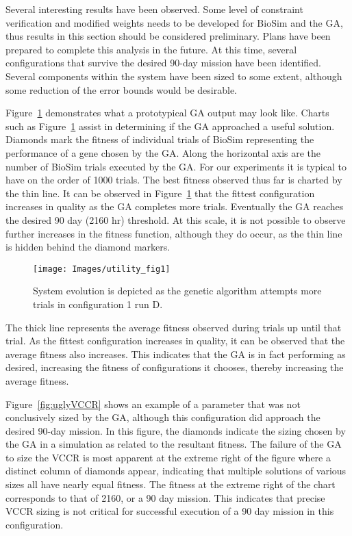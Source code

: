 \documentclass[submit]{aiaa}
\begin{document}
Several interesting results have been observed. 
Some level of constraint verification and modified weights needs to be developed for BioSim and the GA,  thus results in this section should be considered preliminary. 
Plans have been prepared to complete this analysis in the future. 
At this time, several configurations that survive the desired 90-day
mission have been identified.  
Several components within the system have been sized to some extent, although
some reduction of the error bounds would be desirable.

Figure~\ref{fig:utilityFig} demonstrates what a prototypical GA output
may look like. Charts such as Figure~\ref{fig:utilityFig} assist in
determining if the GA approached a useful solution. 
Diamonds mark the fitness of individual trials of BioSim representing
the performance of a gene chosen by the GA.  
Along the horizontal axis are
the number of BioSim trials executed by the GA. For our experiments it
is typical to have on the order of 1000 trials. The best fitness
observed thus far is charted by the thin line. It can be observed in
Figure~\ref{fig:utilityFig} that the fittest configuration increases
in quality as the GA completes more trials. 
Eventually the GA reaches the desired 90 day (2160 hr) threshold. 
At this scale, it is not possible to observe further increases in the fitness function,
although they do occur, as the thin line is hidden behind the diamond
markers.

\begin{figure}[htb]
\texttt{[image: Images/utility\_fig1]}
\caption{System evolution is depicted as the genetic algorithm
  attempts more trials in configuration 1 run D.}
\label{fig:utilityFig}
\end{figure}

The thick line represents the average fitness observed during trials
up until that trial. As the fittest configuration increases in quality,
it can be observed that the average fitness also increases. This
indicates that the GA is in fact performing as desired, increasing the
fitness of configurations it chooses, thereby increasing the average
fitness.

Figure~\ref{fig:uglyVCCR} shows an example of a parameter that was not
conclusively sized by the GA, although this configuration did approach
the desired 90-day mission. In this figure, the diamonds indicate the
sizing chosen by the GA in a simulation as related to the resultant
fitness.
 The failure of the GA to size the VCCR is most apparent at the extreme right of the figure where a distinct column of diamonds appear, indicating that multiple solutions of various sizes all have nearly equal fitness. 
 The fitness at the extreme right of the chart
corresponds to that of 2160, or a 90 day mission. This indicates that
precise VCCR sizing is not critical for successful execution of a 90
day mission in this configuration.
\end{document}
